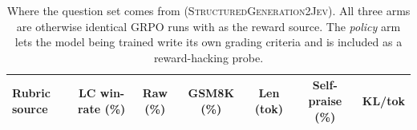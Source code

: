 \begin{table}[t]\centering\small
\caption{Where the \jev{} question set comes from (\textsc{StructuredGeneration2Jev}). All three arms are otherwise identical GRPO runs with \jev{} as the reward source. The \emph{policy} arm lets the model being trained write its own grading criteria and is included as a reward-hacking probe.}
\label{tab:sg2jev}
\begin{tabular}{lcccccc}
\toprule
Rubric source & LC win-rate (\%) & Raw (\%) & GSM8K (\%) & Len (tok) & Self-praise (\%) & KL/tok \\
\midrule

\bottomrule
\end{tabular}
\end{table}
